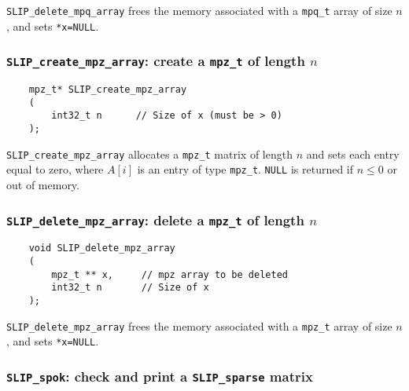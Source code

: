 \documentclass[12pt]{article}
\theoremstyle{definition}
\begin{document}
\verb|SLIP_delete_mpq_array| frees the memory associated with a \verb|mpq_t|
array of size $n$, and sets \verb|*x=NULL|.

\cprotect\subsubsection{\verb|SLIP_create_mpz_array|: create a \verb|mpz_t| of length $n$}
\label{ss:create_mpz_array}

\begin{mdframed}[userdefinedwidth=6in]
{\footnotesize
\begin{verbatim}
    mpz_t* SLIP_create_mpz_array
    (
        int32_t n      // Size of x (must be > 0)
    );
\end{verbatim}
} \end{mdframed}

\verb|SLIP_create_mpz_array| allocates a \verb|mpz_t| matrix of length $n$ and
sets each entry equal to zero, where  $A[i]$ is an entry of type \verb|mpz_t|.
 \verb|NULL| is returned if
$n\le 0$ or out of memory.

\cprotect\subsubsection{\verb|SLIP_delete_mpz_array|: delete a \verb|mpz_t| of length $n$}

\begin{mdframed}[userdefinedwidth=6in]
{\footnotesize
\begin{verbatim}
    void SLIP_delete_mpz_array
    (
        mpz_t ** x,     // mpz array to be deleted
        int32_t n       // Size of x
    );
\end{verbatim}
} \end{mdframed}

\verb|SLIP_delete_mpz_array| frees the memory associated with a \verb|mpz_t|
array of size $n$, and sets \verb|*x=NULL|.

\cprotect\subsubsection{\verb|SLIP_spok|: check and print a \verb|SLIP_sparse| matrix}
\end{document}
